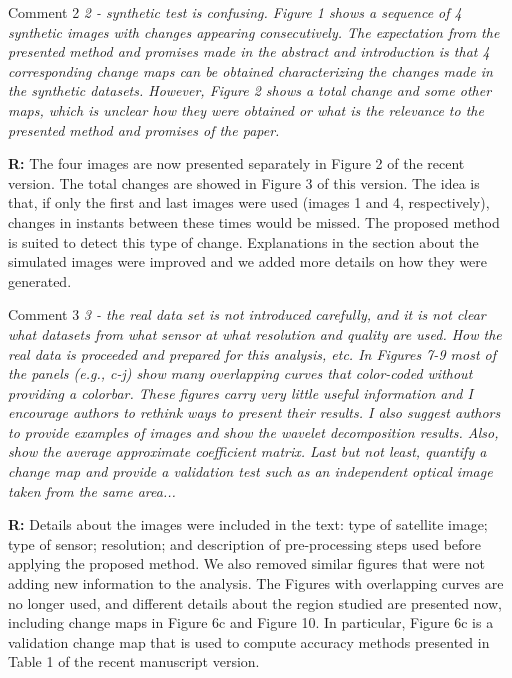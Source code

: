 \documentclass[11pt]{report}
\begin{document}
\begin{mybox}{Comment 2}
\textit{2 - synthetic test is confusing. Figure 1 shows a sequence of 4 synthetic images with changes appearing consecutively.
The expectation from the presented method and promises made in the abstract and introduction is that 4 corresponding
change maps can be obtained characterizing the changes made in the synthetic datasets. However, Figure 2 shows a
total change and some other maps, which is unclear how they were obtained or what is the relevance to the presented
method and promises of the paper.}

\medskip

\textbf{R:} The four images are now presented separately in Figure 2 of the recent version. The total changes are showed in Figure 3 of this version. The idea is that, if only the first and last images were used (images 1 and 4, respectively), changes in instants between these times would be missed. The proposed method is suited to detect this type of change. Explanations in the section about the simulated images were improved and we added more details on how they were generated.
\end{mybox}



\vspace{0.3cm}


\medskip

\begin{mybox}{Comment 3}
\textit{3 - the real data set is not introduced carefully, and it is not clear what datasets from what sensor at what resolution and
quality are used. How the real data is proceeded and prepared for this analysis, etc. In Figures 7-9 most of the panels
(e.g., c-j) show many overlapping curves that color-coded without providing a colorbar. These figures carry very little
useful information and I encourage authors to rethink ways to present their results. I also suggest authors to provide
examples of images and show the wavelet decomposition results. Also, show the average approximate coefficient
matrix. Last but not least, quantify a change map and provide a validation test such as an independent optical image
taken from the same area...}

\medskip

\textbf{R:} Details about the images were included in the text: type of satellite image; type of sensor; resolution; and description of pre-processing steps used before applying the proposed method. We also removed similar figures that were not adding new information to the analysis. The Figures with overlapping curves are no longer used, and different details about the region studied are presented now, including change maps in Figure 6c and Figure 10. In particular, Figure 6c is a validation change map that is used to compute accuracy methods presented in Table 1 of the recent manuscript version.
\end{mybox}
\end{document}
